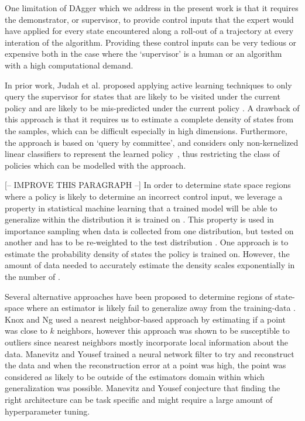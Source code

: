 \documentclass[10pt, conference]{ieeeconf}      %
\begin{document}
One limitation of DAgger which we address in the present work is that it requires the demonstrator, or supervisor, to
provide control inputs that the expert would have applied for every state encountered along a roll-out of a trajectory at every interation of the
algorithm. Providing these control inputs can be very tedious or expensive both in the case where the `supervisor' is a
human or an algorithm with a high computational demand.

In prior work, Judah et al. proposed applying active learning techniques to only query the supervisor for states that are likely to be
visited under the current policy and are likely to be mis-predicted under the current policy
\cite{judah2011active,judah2012active}. A drawback of this approach is that it requires us to estimate a complete
density of states from the samples, which can be difficult especially in high dimensions. Furthermore, the  
approach is based on `query by committee', and considers only non-kernelized linear classifiers to represent the
learned policy~\cite{gilad2005query}, thus restricting the class of policies which can be modelled with the approach.

{\color{blue}[-- IMPROVE THIS PARAGRAPH --]} In order to determine state space regions where a policy is likely to determine
an incorrect control input, we leverage a
property in statistical machine learning that a trained model will be able to generalize within the distribution it is
trained on \cite{tokdar2010importance}. This property is used in importance sampling when data is collected from one
distribution, but tested on another and has to be re-weighted to the test distribution \cite{huang2006correcting}. One
approach is to estimate the probability density of states the policy is trained on. However, the amount of data needed to accurately estimate the density scales exponentially in the number of \cite{nadaraya1964estimating}.

Several alternative approaches have been proposed to determine regions of state-space where an estimator is likely fail
to generalize away from the training-data \cite{markou2003novelty}. Knox and Ng \cite{knox1998algorithms} used a nearest
neighbor-based approach by estimating if a point was close to $k$ neighbors, however this approach was shown to be
susceptible to outliers since nearest neighbors mostly incorporate local information about the data. Manevitz and Yousef
\cite{manevitz2002one} trained a neural network filter to try and reconstruct the data and when the reconstruction error
at a point was high, the point was considered as likely to be outside of the estimators domain within which
generalization was possible. Manevitz and Yousef conjecture  that finding the right architecture can be task specific
and might require a large amount of hyperparameter tuning.
\end{document}
